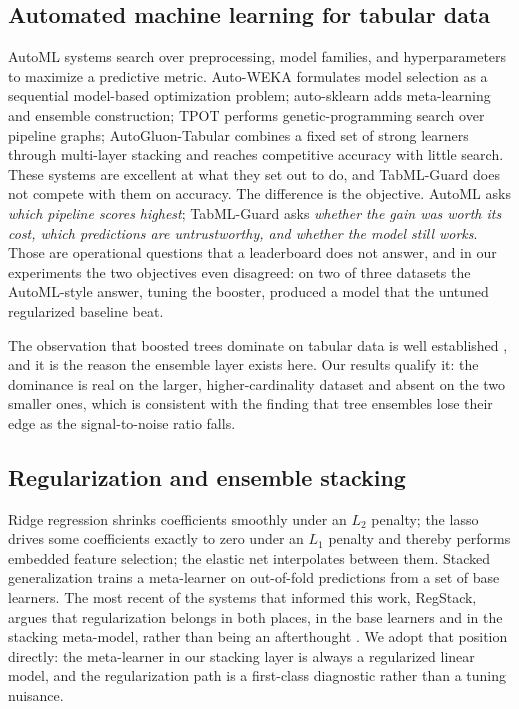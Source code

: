 \documentclass{ieeeaccess}
\begin{document}
\subsection{Automated machine learning for tabular data}
AutoML systems search over preprocessing, model families, and hyperparameters to maximize a predictive metric. Auto-WEKA \cite{kotthoff2013auto} formulates model selection as a sequential model-based optimization problem; auto-sklearn \cite{feurer2015auto} adds meta-learning and ensemble construction; TPOT \cite{olson2016tpot} performs genetic-programming search over pipeline graphs; AutoGluon-Tabular \cite{erickson2020autogluon} combines a fixed set of strong learners through multi-layer stacking and reaches competitive accuracy with little search. These systems are excellent at what they set out to do, and TabML-Guard does not compete with them on accuracy. The difference is the objective. AutoML asks \emph{which pipeline scores highest}; TabML-Guard asks \emph{whether the gain was worth its cost, which predictions are untrustworthy, and whether the model still works}. Those are operational questions that a leaderboard does not answer, and in our experiments the two objectives even disagreed: on two of three datasets the AutoML-style answer, tuning the booster, produced a model that the untuned regularized baseline beat.

The observation that boosted trees dominate on tabular data is well established \cite{grinsztajn2022tree,shwartz2022tabular}, and it is the reason the ensemble layer exists here. Our results qualify it: the dominance is real on the larger, higher-cardinality dataset and absent on the two smaller ones, which is consistent with the finding that tree ensembles lose their edge as the signal-to-noise ratio falls.

\subsection{Regularization and ensemble stacking}
Ridge regression \cite{hoerl1970ridge} shrinks coefficients smoothly under an $L_2$ penalty; the lasso \cite{tibshirani1996lasso} drives some coefficients exactly to zero under an $L_1$ penalty and thereby performs embedded feature selection; the elastic net \cite{zou2005elastic} interpolates between them. Stacked generalization \cite{wolpert1992stacked} trains a meta-learner on out-of-fold predictions from a set of base learners. The most recent of the systems that informed this work, RegStack, argues that regularization belongs in both places, in the base learners and in the stacking meta-model, rather than being an afterthought \cite{regstack2025}. We adopt that position directly: the meta-learner in our stacking layer is always a regularized linear model, and the regularization path is a first-class diagnostic rather than a tuning nuisance.
\end{document}
